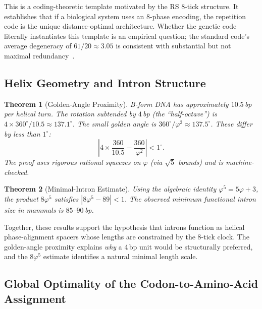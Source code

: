 \documentclass[11pt,a4paper]{article}
\newtheorem{theorem}{Theorem}[section]
\newcommand{\ph}{\varphi}
\begin{document}
This is a coding-theoretic template motivated by the RS 8-tick structure. It establishes that if a biological system uses an 8-phase encoding, the repetition code is the unique distance-optimal architecture. Whether the genetic code literally instantiates this template is an empirical question; the standard code's average degeneracy of $61/20 \approx 3.05$ is consistent with substantial but not maximal redundancy~\cite{HaigHurst1991, FreelandHurst1998}.

\subsection{Helix Geometry and Intron Structure}

\begin{theorem}[Golden-Angle Proximity]
\label{thm:golden-angle}
B-form DNA has approximately $10.5$\,bp per helical turn. The rotation subtended by $4$\,bp (the ``half-octave'') is $4 \times 360^\circ / 10.5 \approx 137.1^\circ$. The small golden angle is $360^\circ / \ph^2 \approx 137.5^\circ$. These differ by less than $1^\circ$:
\[
\left| 4 \times \frac{360}{10.5} - \frac{360}{\ph^2} \right| < 1^\circ.
\]
The proof uses rigorous rational squeezes on $\ph$ (via $\sqrt{5}$ bounds) and is machine-checked.
\end{theorem}

\begin{theorem}[Minimal-Intron Estimate]
\label{thm:min-intron}
Using the algebraic identity $\ph^5 = 5\ph + 3$, the product $8\ph^5$ satisfies $|8\ph^5 - 89| < 1$. The observed minimum functional intron size in mammals is $85$--$90$\,bp.
\end{theorem}

Together, these results support the hypothesis that introns function as helical phase-alignment spacers whose lengths are constrained by the 8-tick clock. The golden-angle proximity explains \emph{why} a 4\,bp unit would be structurally preferred, and the $8\ph^5$ estimate identifies a natural minimal length scale.

\subsection{Global Optimality of the Codon-to-Amino-Acid Assignment}
\end{document}
